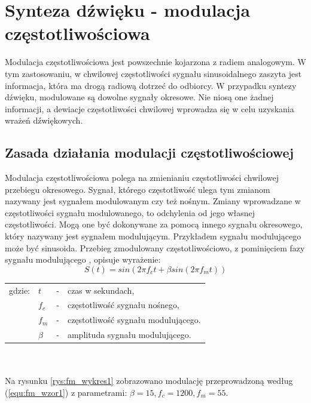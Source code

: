 \chapter{Synteza dźwięku - modulacja częstotliwościowa}\label{chapter_fm}
Modulacja częstotliwościowa jest powszechnie kojarzona z radiem analogowym. W tym zastosowaniu, w chwilowej częstotliwości sygnału sinusoidalnego zaszyta jest informacja, która ma drogą radiową dotrzeć do odbiorcy. W przypadku syntezy dźwięku, modulowane są dowolne sygnały okresowe. Nie niosą one żadnej informacji, a dewiacje częstotliwości chwilowej wprowadza się w celu uzyskania wrażeń dźwiękowych.
\section{Zasada działania modulacji częstotliwościowej}
Modulacja częstotliwościowa polega na zmienianiu częstotliwości chwilowej przebiegu okresowego. Sygnał, którego częstotliwość ulega tym zmianom nazywany jest sygnałem modulowanym czy też nośnym. Zmiany wprowadzane w częstotliwości sygnału modulowanego, to odchylenia od jego własnej częstotliwości. Mogą one być dokonywane za pomocą innego sygnału okresowego, który nazywany jest sygnałem modulującym. Przykładem sygnału modulującego może być sinusoida. Przebieg zmodulowany częstotliwościowo, z pominięciem fazy sygnału modulującego \cite{oland}, opisuje wyrażenie:
\begin{equation} \label{equ:fm_wzor1}
S(t)= sin(2 \pi f_c t + \beta sin(2 \pi f_m t))
\end{equation}
\begin{tabular}{ l l l l}
	gdzie: & $t$ &  - & czas w sekundach, \\
	&	$f_c$ & - &  częstotliwość sygnału nośnego,\\
	&	$f_m$ & - &  częstotliwość sygnału modulującego.\\
	&	$\beta$ & - & amplituda sygnału modulującego.\\
\end{tabular} \\ \\
Na rysunku \ref{rys:fm_wykres1} zobrazowano modulację przeprowadzoną według (\ref{equ:fm_wzor1}) z parametrami: $\beta = 15, f_c = 1200, f_m = 55$.
